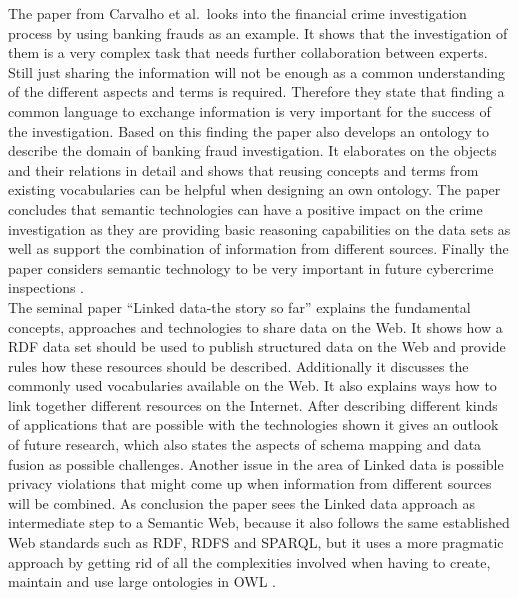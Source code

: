 The paper from Carvalho et al.\ looks into the financial crime investigation process by using banking frauds as an example. It shows that the investigation of them is a very complex task that needs further collaboration between experts. Still just sharing the information will not be enough as a common understanding of the different aspects and terms is required. Therefore they state that finding a common language to exchange information is very important for the success of the investigation. Based on this finding the paper also develops an ontology to describe the domain of banking fraud investigation. It elaborates on the objects and their relations in detail and shows that reusing concepts and terms from existing vocabularies can be helpful when designing an own ontology. The paper concludes that semantic technologies can have a positive impact on the crime investigation as they are providing basic reasoning capabilities on the data sets as well as support the combination of information from different sources. Finally the paper considers semantic technology to be very important in future cybercrime inspections \citep{carvalhoapplying}. \\

The seminal paper ``Linked data-the story so far'' explains the fundamental concepts, approaches and technologies to share data on the Web. It shows how a \gls{RDF} data set should be used to publish structured data on the Web and provide rules how these resources should be described. Additionally it discusses the commonly used vocabularies available on the Web. It also explains ways how to link together different resources on the Internet. After describing different kinds of applications that are possible with the technologies shown it gives an outlook of future research, which also states the aspects of schema mapping and data fusion as possible challenges. Another issue in the area of Linked data is possible privacy violations that might come up when information from different sources will be combined. As conclusion the paper sees the Linked data approach as intermediate step to a Semantic Web, because it also follows the same established Web standards such as \gls{RDF}, \gls{RDFS} and \gls{SPARQL}, but it uses a more pragmatic approach by getting rid of all the complexities involved when having to create, maintain and use large ontologies in \gls{OWL} \citep{bizer2009linked}. \\

